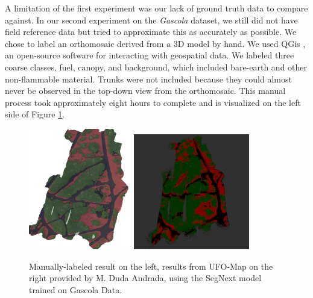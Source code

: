 A limitation of the first experiment was our lack of ground truth data to compare against.
In our second experiment on the \textit{Gascola} dataset, we still did not have field reference data but tried to approximate this as accurately as possible.
We chose to label an orthomosaic derived from a 3D model by hand. We used QGis \cite{QGIS_software}, an open-source software for interacting with geospatial data. We labeled three coarse classes, fuel, canopy, and background, which included bare-earth and other non-flammable material. Trunks were not included because they could almost never be observed in the top-down view from the orthomosaic. This manual process took approximately eight hours to complete and is visualized on the left side of Figure \ref{fig:results:semantic_map_UFO}.

\begin{figure}[H]
    \centering
    \includegraphics[width=0.40\textwidth, angle=15]{figs/results/semantic_mapping/labeled_orthomoasaic.png}
    \includegraphics[width=0.45\textwidth]{figs/results/semantic_mapping/segnext_gc5_ufomap.png}
    \caption{Manually-labeled result on the left, results from UFO-Map on the right provided by M. Duda Andrada, using the SegNext \cite{Guo2022SegNeXt:Segmentation} model trained on Gascola Data.}
    \label{fig:results:semantic_map_UFO}
\end{figure}

